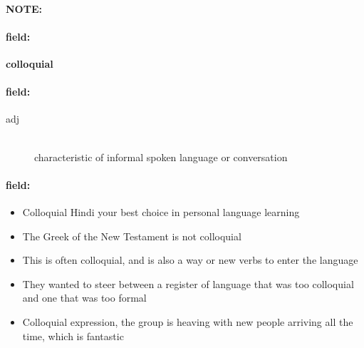 \documentclass[12pt]{article}
\newenvironment{note}{\paragraph{NOTE:}}{}
\newenvironment{field}{\paragraph{field:}}{}
\begin{document}
\begin{note}
\begin{field}
\textbf{\large colloquial}
\end{field}


\begin{field}
\begin{description}
\item[adj] \hfill \\ 
characteristic of informal spoken language or conversation

\end{description}
\end{field}

\begin{field}
\begin{itemize}
\item Colloquial Hindi your best choice in personal language learning
\item The Greek of the New Testament is not colloquial
\item This is often colloquial, and is also a way or new verbs to enter the language
\item They wanted to steer between a register of language that was too colloquial and one that was too formal
\item Colloquial expression, the group is heaving with new people arriving all the time, which is fantastic
\end{itemize}
\end{field}
\end{note}
\end{document}
